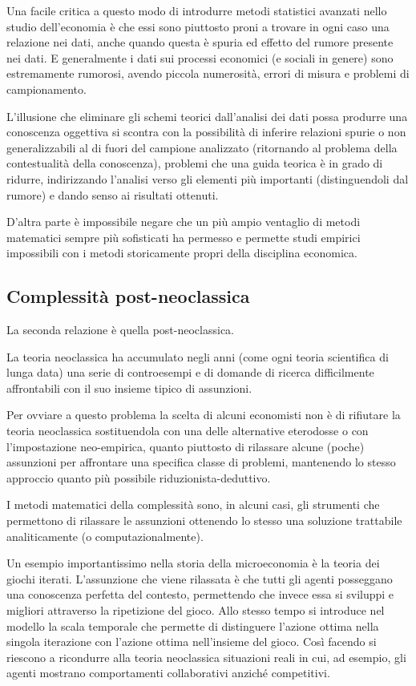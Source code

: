 \documentclass[a4paper, headings=standardclasses]{scrartcl}
\begin{document}
Una facile critica a questo modo di introdurre metodi statistici avanzati nello studio dell'economia è che essi sono piuttosto proni a trovare in ogni caso una relazione nei dati, anche quando questa è spuria ed effetto del rumore presente nei dati. E generalmente i dati sui processi economici (e sociali in genere) sono estremamente rumorosi, avendo piccola numerosità, errori di misura e problemi di campionamento.

L'illusione che eliminare gli schemi teorici dall'analisi dei dati possa produrre una conoscenza oggettiva si scontra con la possibilità di inferire relazioni spurie o non generalizzabili al di fuori del campione analizzato (ritornando al problema della contestualità della conoscenza), problemi che una guida teorica è in grado di ridurre, indirizzando l'analisi verso gli elementi più importanti (distinguendoli dal rumore) e dando senso ai risultati ottenuti.

D'altra parte è impossibile negare che un più ampio ventaglio di metodi matematici sempre più sofisticati ha permesso e permette studi empirici impossibili con i metodi storicamente propri della disciplina economica.

\subsection{Complessità post-neoclassica}
La seconda relazione è quella post-neoclassica.

La teoria neoclassica ha accumulato negli anni (come ogni teoria scientifica di lunga data) una serie di controesempi e di domande di ricerca difficilmente affrontabili con il suo insieme tipico di assunzioni.

Per ovviare a questo problema la scelta di alcuni economisti non è di rifiutare la teoria neoclassica sostituendola con una delle alternative eterodosse o con l'impostazione neo-empirica, quanto piuttosto di rilassare alcune (poche) assunzioni per affrontare una specifica classe di problemi, mantenendo lo stesso approccio quanto più possibile riduzionista-deduttivo.

I metodi matematici della complessità sono, in alcuni casi, gli strumenti che permettono di rilassare le assunzioni ottenendo lo stesso una soluzione trattabile analiticamente (o computazionalmente).

Un esempio importantissimo nella storia della microeconomia è la teoria dei giochi iterati. L'assunzione che viene rilassata è che tutti gli agenti posseggano una conoscenza perfetta del contesto, permettendo che invece essa si sviluppi e migliori attraverso la ripetizione del gioco. Allo stesso tempo si introduce nel modello la scala temporale che permette di distinguere l'azione ottima nella singola iterazione con l'azione ottima nell'insieme del gioco.
Così facendo si riescono a ricondurre alla teoria neoclassica situazioni reali in cui, ad esempio, gli agenti mostrano comportamenti collaborativi anziché competitivi.
\end{document}
